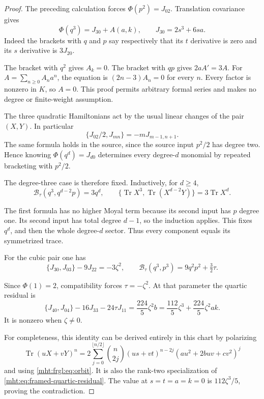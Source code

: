 \begin{proof}
The preceding calculation forces $\Phi(p^2)=J_{02}$.
Translation covariance gives
\[
 \Phi(q^3)=J_{30}+A(a,k),\qquad J_{30}=2s^3+6sa.
\]
Indeed the brackets with $q$ and $p$ say respectively that its $t$
derivative is zero and its $s$ derivative is $3J_{20}$.

The bracket with $q^2$ gives $A_k=0$. The bracket with $qp$ gives
$2aA'=3A$. For $A=\sum_{n\geq0}A_na^n$, the equation is
$(2n-3)A_n=0$ for every $n$. Every factor is nonzero in $K$, so
$A=0$. This proof permits arbitrary formal series and makes no degree
or finite-weight assumption.

The three quadratic Hamiltonians act by the usual linear changes of
the pair $(X,Y)$. In particular
\[
 \{J_{02}/2,J_{mn}\}=-mJ_{m-1,n+1}.
\]
The same formula holds in the source, since the source input $p^2/2$
has degree two. Hence knowing $\Phi(q^d)=J_{d0}$ determines every
degree-$d$ monomial by repeated bracketing with $p^2/2$.

The degree-three case is therefore fixed. Inductively, for $d\geq4$,
\[
 \mathcal B_\tau(q^3,q^{d-2}p)=3q^d,
 \qquad
 \{\operatorname{Tr}X^3,\operatorname{Tr}(X^{d-2}Y)\}
       =3\operatorname{Tr}X^d.
\]

The first formula has no higher Moyal term because its second input
has $p$ degree one. Its second input has total degree $d-1$, so the
induction applies. This fixes $q^d$, and then the whole degree-$d$
sector. Thus every component equals its symmetrized trace.

For the cubic pair one has
\[
 \{J_{30},J_{03}\}-9J_{22}=-3\zeta^2,
 \qquad \mathcal B_\tau(q^3,p^3)=9q^2p^2+\tfrac32\tau.
\]

Since $\Phi(1)=2$, compatibility forces $\tau=-\zeta^2$.
At that parameter the quartic residual is
\begin{equation}\label{mht:frgl:eq:local-residual}
 \{J_{40},J_{04}\}-16J_{33}-24\tau J_{11}
   =\frac{224}{5}\zeta^2 b
   =\frac{112}{5}\zeta^3+\frac{224}{5}\zeta^2ak.
\end{equation}
It is nonzero when $\zeta\ne0$.

For completeness, this identity can
be derived entirely in this chart by polarizing
\[
 \operatorname{Tr}(uX+vY)^n
   =2\sum_{j=0}^{\lfloor n/2\rfloor}
        \binom n{2j}(us+vt)^{n-2j}
          (a u^2+2buv+c v^2)^j
\]
and using \eqref{mht:frgl:eq:orbit}. It is also the rank-two specialization
of \eqref{mht:eq:framed-quartic-residual}. The
value at $s=t=a=k=0$ is $112\zeta^3/5$, proving the contradiction.
\end{proof}

